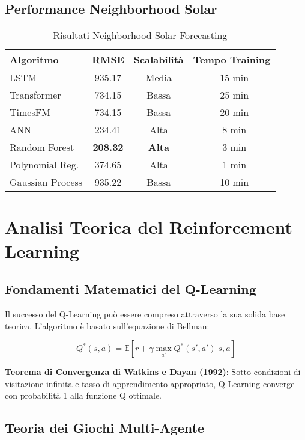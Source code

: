 \documentclass[12pt,a4paper,twoside]{report}
\begin{document}
\begin{appendices}
\subsection{Performance Neighborhood Solar}

\begin{table}[H]
\centering
\caption{Risultati Neighborhood Solar Forecasting}
\label{tab:neighborhood_detailed}
\begin{tabular}{|l|c|c|c|}
\hline
\textbf{Algoritmo} & \textbf{RMSE} & \textbf{Scalabilità} & \textbf{Tempo Training} \\
\hline
LSTM & 935.17 & Media & ~15 min \\
Transformer & 734.15 & Bassa & ~25 min \\
TimesFM & 734.15 & Bassa & ~20 min \\
ANN & 234.41 & Alta & ~8 min \\
Random Forest & \textbf{208.32} & \textbf{Alta} & ~3 min \\
Polynomial Reg. & 374.65 & Alta & ~1 min \\
Gaussian Process & 935.22 & Bassa & ~10 min \\
\hline
\end{tabular}
\end{table}

\section{Analisi Teorica del Reinforcement Learning}

\subsection{Fondamenti Matematici del Q-Learning}

Il successo del Q-Learning può essere compreso attraverso la sua solida base teorica. L'algoritmo è basato sull'equazione di Bellman:

\begin{equation}
Q^*(s,a) = \mathbb{E}[r + \gamma \max_{a'} Q^*(s',a') | s,a]
\end{equation}

\textbf{Teorema di Convergenza di Watkins e Dayan (1992)}:
Sotto condizioni di visitazione infinita e tasso di apprendimento appropriato, Q-Learning converge con probabilità 1 alla funzione Q ottimale.

\subsection{Teoria dei Giochi Multi-Agente}


\end{appendices}
\end{document}
